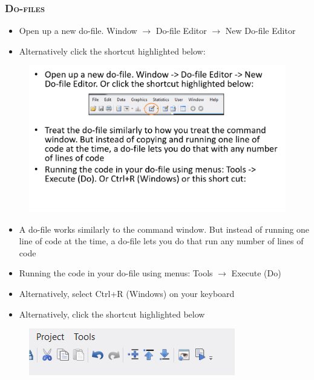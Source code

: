 \documentclass[10pt]{beamer}
\begin{document}
	\begin{frame}
		\frametitle{\textsc{Do-files}}
		\begin{itemize}
			\item Open up a new do-file. Window $\rightarrow$ Do-file Editor $\rightarrow$ New Do-file Editor
			\item Alternatively click the shortcut highlighted below:
		\end{itemize}
		\begin{figure}[H] 
			\centering
			\includegraphics[width=0.9\linewidth]{dofile}
		\end{figure}
		\begin{itemize}
			\item A do-file works similarly to the command window. But instead of running one line of code at the time, a do-file lets you do that run any number of lines of code

			\item Running the code in your do-file using menus: Tools $\rightarrow$ Execute (Do) 
			\item Alternatively, select Ctrl+R (Windows) on your keyboard
			\item Alternatively, click the shortcut highlighted below

		\end{itemize}
		\begin{figure}[H] 
			\centering
			\includegraphics[width=0.9\linewidth]{run}
		\end{figure}		
	\end{frame}
	
\end{document}
